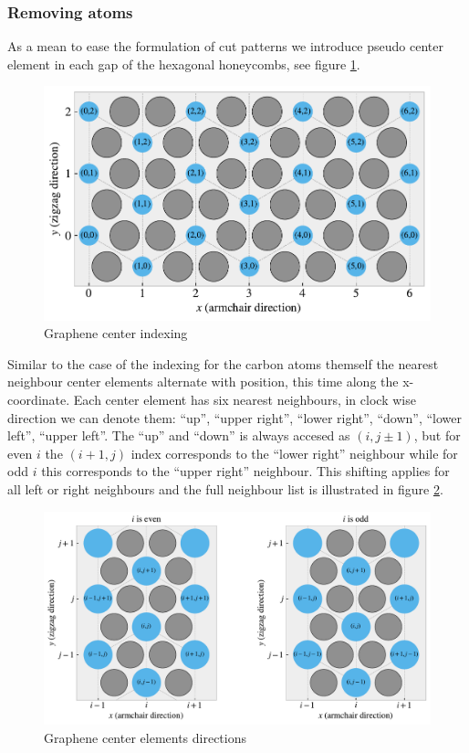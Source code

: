\subsubsection{Removing atoms}

As a mean to ease the formulation of cut patterns we introduce pseudo center element in each gap of the hexagonal honeycombs, see figure \ref{fig:center_indexing}. 

\begin{figure}[H]
  \centering
  \includegraphics[width=0.7\linewidth]{figures/center_indexing.pdf}
  \caption{Graphene center indexing}
  \label{fig:center_indexing}
\end{figure}




Similar to the case of the indexing for the carbon atoms themself the nearest neighbour center elements alternate with position, this time along the x-coordinate. Each center element has six nearest neighbours, in clock wise direction we can denote them: ``up'', ``upper right'', ``lower right'', ``down'', ``lower left'', ``upper left''. The ``up'' and ``down'' is always accesed as $(i,j\pm 1)$, but for even $i$ the $(i+1,j)$ index corresponds to the ``lower right'' neighbour while for odd $i$ this corresponds to the ``upper right'' neighbour. This shifting applies for all left or right neighbours and the full neighbour list is illustrated in figure \ref{fig:center_directions}. 


\begin{figure}[H]
  \centering
  \includegraphics[width=0.7\linewidth]{figures/center_directions.pdf}
  \caption{Graphene center elements directions}
  \label{fig:center_directions}
\end{figure}


